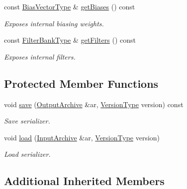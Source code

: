 \begin{DoxyCompactItemize}
\item 
const \hyperlink{classffnn_1_1layer_1_1_receptive_volume_a22ec68a5323233ca8bbcacc2b7387dbb}{Bias\-Vector\-Type} \& \hyperlink{classffnn_1_1layer_1_1_receptive_volume_a8fc32191a95ef94a0fa6d0366f69cf80}{get\-Biases} () const 
\begin{DoxyCompactList}\small\item\em Exposes internal biasing weights. \end{DoxyCompactList}\item 
const \hyperlink{classffnn_1_1layer_1_1_receptive_volume_a7c97795baaf3c9b1e7db3cb3841d8829}{Filter\-Bank\-Type} \& \hyperlink{classffnn_1_1layer_1_1_receptive_volume_a12e9b530df6207faef15c49e63086047}{get\-Filters} () const 
\begin{DoxyCompactList}\small\item\em Exposes internal filters. \end{DoxyCompactList}\end{DoxyCompactItemize}
\subsection*{Protected Member Functions}
\begin{DoxyCompactItemize}
\item 
void \hyperlink{classffnn_1_1layer_1_1_receptive_volume_a9f813e0c5c60d572a296b8ec1fc25086}{save} (\hyperlink{classffnn_1_1traits_1_1_serializable_a08d986df75d363fa79506d4f6045cb9f}{Output\-Archive} \&ar, \hyperlink{classffnn_1_1traits_1_1_serializable_a08924b3b7d20cb3cb6eafe517d4f7b30}{Version\-Type} version) const 
\begin{DoxyCompactList}\small\item\em Save serializer. \end{DoxyCompactList}\item 
void \hyperlink{classffnn_1_1layer_1_1_receptive_volume_aebfd8f149057b061d6880669376175e3}{load} (\hyperlink{classffnn_1_1traits_1_1_serializable_a6e626759259f8f370dd4303b4441a234}{Input\-Archive} \&ar, \hyperlink{classffnn_1_1traits_1_1_serializable_a08924b3b7d20cb3cb6eafe517d4f7b30}{Version\-Type} version)
\begin{DoxyCompactList}\small\item\em Load serializer. \end{DoxyCompactList}\end{DoxyCompactItemize}
\subsection*{Additional Inherited Members}


